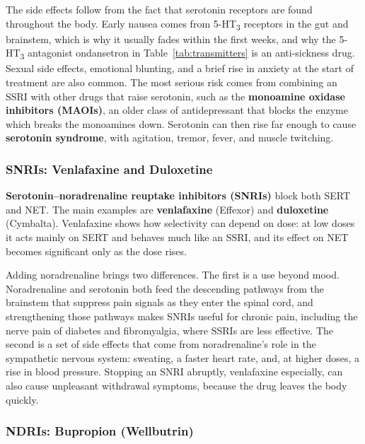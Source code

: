 \documentclass[11pt]{article}
\begin{document}
The side effects follow from the fact that serotonin receptors are found throughout the body. Early nausea comes from 5-HT\textsubscript{3} receptors in the gut and brainstem, which is why it usually fades within the first weeks, and why the 5-HT\textsubscript{3} antagonist ondansetron in Table~\ref{tab:transmitters} is an anti-sickness drug. Sexual side effects, emotional blunting, and a brief rise in anxiety at the start of treatment are also common. The most serious risk comes from combining an SSRI with other drugs that raise serotonin, such as the \textbf{monoamine oxidase inhibitors (MAOIs)}, an older class of antidepressant that blocks the enzyme which breaks the monoamines down. Serotonin can then rise far enough to cause \textbf{serotonin syndrome}, with agitation, tremor, fever, and muscle twitching.

\subsubsection{SNRIs: Venlafaxine and Duloxetine}

\textbf{Serotonin--noradrenaline reuptake inhibitors (SNRIs)} block both SERT and NET. The main examples are \textbf{venlafaxine} (Effexor) and \textbf{duloxetine} (Cymbalta). Venlafaxine shows how selectivity can depend on dose: at low doses it acts mainly on SERT and behaves much like an SSRI, and its effect on NET becomes significant only as the dose rises.

Adding noradrenaline brings two differences. The first is a use beyond mood. Noradrenaline and serotonin both feed the descending pathways from the brainstem that suppress pain signals as they enter the spinal cord, and strengthening those pathways makes SNRIs useful for chronic pain, including the nerve pain of diabetes and fibromyalgia, where SSRIs are less effective. The second is a set of side effects that come from noradrenaline's role in the sympathetic nervous system: sweating, a faster heart rate, and, at higher doses, a rise in blood pressure. Stopping an SNRI abruptly, venlafaxine especially, can also cause unpleasant withdrawal symptoms, because the drug leaves the body quickly.

\subsubsection{NDRIs: Bupropion (Wellbutrin)}
\end{document}
